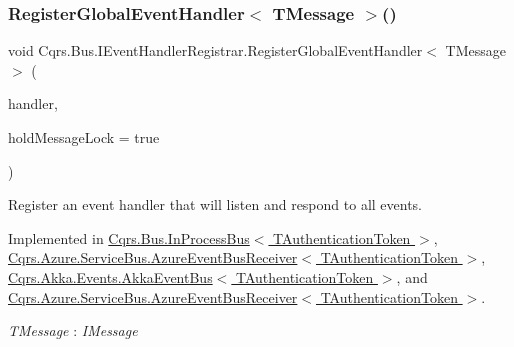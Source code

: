 \subsubsection{\texorpdfstring{Register\+Global\+Event\+Handler$<$ T\+Message $>$()}{RegisterGlobalEventHandler< TMessage >()}}
{\footnotesize\ttfamily void Cqrs.\+Bus.\+I\+Event\+Handler\+Registrar.\+Register\+Global\+Event\+Handler$<$ T\+Message $>$ (\begin{DoxyParamCaption}\item[{Action$<$ T\+Message $>$}]{handler,  }\item[{bool}]{hold\+Message\+Lock = {\ttfamily true} }\end{DoxyParamCaption})}



Register an event handler that will listen and respond to all events. 



Implemented in \hyperlink{classCqrs_1_1Bus_1_1InProcessBus_ad9c2a857323c70f07eb0eb5632ec63e7_ad9c2a857323c70f07eb0eb5632ec63e7}{Cqrs.\+Bus.\+In\+Process\+Bus$<$ T\+Authentication\+Token $>$}, \hyperlink{classCqrs_1_1Azure_1_1ServiceBus_1_1AzureEventBusReceiver_a86f83510ec3d33931e37cfe6b0fb83db_a86f83510ec3d33931e37cfe6b0fb83db}{Cqrs.\+Azure.\+Service\+Bus.\+Azure\+Event\+Bus\+Receiver$<$ T\+Authentication\+Token $>$}, \hyperlink{classCqrs_1_1Akka_1_1Events_1_1AkkaEventBus_ab0df68070fbc625cad5cd2e74667b01d_ab0df68070fbc625cad5cd2e74667b01d}{Cqrs.\+Akka.\+Events.\+Akka\+Event\+Bus$<$ T\+Authentication\+Token $>$}, and \hyperlink{classCqrs_1_1Azure_1_1ServiceBus_1_1AzureEventBusReceiver_a86f83510ec3d33931e37cfe6b0fb83db_a86f83510ec3d33931e37cfe6b0fb83db}{Cqrs.\+Azure.\+Service\+Bus.\+Azure\+Event\+Bus\+Receiver$<$ T\+Authentication\+Token $>$}.

\begin{Desc}
\item[Type Constraints]\begin{description}
\item[{\em T\+Message} : {\em I\+Message}]\end{description}
\end{Desc}
